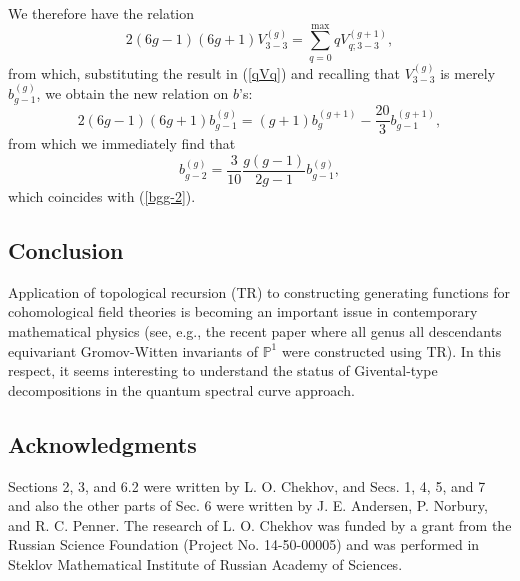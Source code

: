 \documentclass[11pt]{article}
\renewcommand{\theequation}{\thesection.\arabic{equation}}
\def\beq{\begin{equation}}
\def\eeq{\end{equation}}
\theoremstyle{plain}
\theoremstyle{definition}
\def\beq{\begin{equation}}
\def\eeq{\end{equation}}
\begin{document}
We therefore have the relation
\beq
\label{Vg->Vg+1}
2(6g-1)(6g+1)V^{(g)}_{3{-}3}=\sum_{q=0}^{\mathrm{max}}qV^{(g+1)}_{q;3{-}3},
\eeq
from which, substituting the result in (\ref{qVq}) and recalling that $V^{(g)}_{3{-}3}$ is merely
$b^{(g)}_{g-1}$, we obtain the new relation on $b$'s:
\beq
\label{bg-bg-1}
2(6g-1)(6g+1)b^{(g)}_{g-1}=(g+1)b^{(g+1)}_{g}-\frac{20}{3}b^{(g+1)}_{g-1},
\eeq
from which we immediately find that
\beq
\label{bgg-3}
b^{(g)}_{g-2}=\frac{3}{10}\frac{g(g-1)}{2g-1}b^{(g)}_{g-1},
\eeq
which coincides with (\ref{bgg-2}).





\subsection*{Conclusion}
Application of topological recursion (TR) to constructing generating 
functions for cohomological field theories is becoming an important issue in 
contemporary mathematical physics (see, e.g., the recent paper \cite{FLZ14} where all genus all descendants equivariant Gromov-Witten invariants of ${\mathbb P}^1$ were constructed using TR). In this respect, it seems interesting to understand the status of 
Givental-type decompositions in the quantum spectral curve approach. 


\subsection*{Acknowledgments}
Sections 2, 3, and 6.2 were written by L. O. Chekhov, and Secs. 1, 4, 5, and 7 and also the other parts of Sec. 6
were written by J. E. Andersen, P. Norbury, and R. C. Penner.
The research of L. O. Chekhov was funded by a grant from the Russian Science Foundation (Project No. 14-50-00005) and was performed in Steklov Mathematical Institute of Russian Academy of Sciences.




\end{document}
